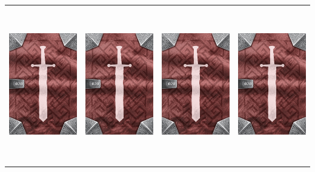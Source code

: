 \documentclass{minimal}
\begin{document}
{\begin{longtable}{llll}
\includegraphics[width=44mm,height=68mm]{./15-21/gh-020-minor-mana-potion-back.png} &
\includegraphics[width=44mm,height=68mm]{./15-21/gh-020-minor-mana-potion-back.png} &
\includegraphics[width=44mm,height=68mm]{./15-21/gh-020-minor-mana-potion-back.png} &
\includegraphics[width=44mm,height=68mm]{./15-21/gh-020-minor-mana-potion-back.png}\\ 

\end{longtable}}
\end{document}
